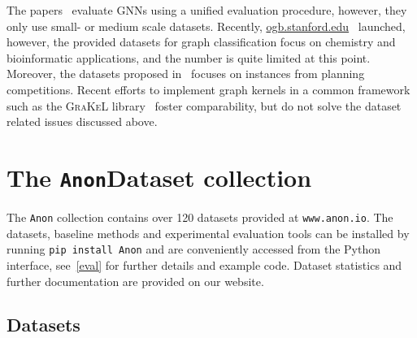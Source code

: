 \documentclass{article}
\theoremstyle{definition}
\begin{document}
The papers~\cite{Fey+2019,Che+2019new,Err+2019,Dwi+2020} evaluate GNNs using a unified evaluation procedure, however, they only use small- or medium scale datasets. Recently, \url{ogb.stanford.edu}~\cite{Hu+2020} launched, however, the provided datasets for graph classification focus on chemistry and bioinformatic applications, and the number is quite limited at this point. Moreover, the datasets proposed in~\cite{Fer+2019} focuses on instances from planning competitions. 
Recent efforts to implement graph kernels in a common framework such as the \textsc{GraKeL} library~\cite{Sig+2018} foster comparability, but do not solve the dataset related issues discussed above.


\section{The \texttt{Anon}Dataset collection}

The \texttt{Anon} collection contains over 120 datasets provided at \texttt{www.anon.io}. The datasets, baseline methods and experimental evaluation tools can be installed by running \texttt{pip install Anon} and are conveniently accessed from the Python interface, see~\cref{eval} for further details and example code. Dataset statistics and further documentation are provided on our website.


\subsection{Datasets}
\end{document}
